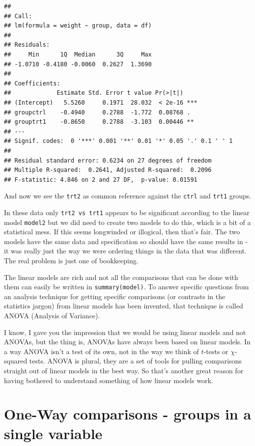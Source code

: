 \documentclass[
]{book}
\newenvironment{sidenote}
{ \begin{tcolorbox}[colbacktitle=blue!50!white,
title=huh?,coltitle=white,
fonttitle=\bfseries] }
{  \end{tcolorbox} }
\begin{document}
\begin{verbatim}
## 
## Call:
## lm(formula = weight ~ group, data = df)
## 
## Residuals:
##     Min      1Q  Median      3Q     Max 
## -1.0710 -0.4180 -0.0060  0.2627  1.3690 
## 
## Coefficients:
##             Estimate Std. Error t value Pr(>|t|)    
## (Intercept)   5.5260     0.1971  28.032  < 2e-16 ***
## groupctrl    -0.4940     0.2788  -1.772  0.08768 .  
## grouptrt1    -0.8650     0.2788  -3.103  0.00446 ** 
## ---
## Signif. codes:  0 '***' 0.001 '**' 0.01 '*' 0.05 '.' 0.1 ' ' 1
## 
## Residual standard error: 0.6234 on 27 degrees of freedom
## Multiple R-squared:  0.2641,	Adjusted R-squared:  0.2096 
## F-statistic: 4.846 on 2 and 27 DF,  p-value: 0.01591
\end{verbatim}

And now we see the \texttt{trt2} as common reference against the \texttt{ctrl} and \texttt{trt1} groups.

In these data only \texttt{trt2\ vs\ trt1} appears to be significant according to the linear model \texttt{model2} but we did need to create two models to do this, which is a bit of a statistical mess. If this seems longwinded or illogical, then that's fair. The two models have the same data and specification so should have the same results in - it was really just the way we were ordering things in the data that was different. The real problem is just one of bookkeeping.

The linear models are rich and not all the comparisons that can be done with them can easily be written in \texttt{summary(model)}. To answer specific questions from an analysis technique for getting specific comparisons (or contrasts in the statistics jargon) from linear models has been invented, that technique is called ANOVA (Analysis of Variance).

\begin{sidenote}
I know, I gave you the impression that we would be using linear models and not ANOVAs, but the thing is, ANOVAs have always been based on linear models. In a way ANOVA isn't a test of its own, not in the way we think of \(t\)-tests or \(\chi\)-squared tests. ANOVA is plural, they are a set of tools for pulling comparisons straight out of linear models in the best way. So that's another great reason for having bothered to understand something of how linear models work.
\end{sidenote}

\hypertarget{one-way-comparisons---groups-in-a-single-variable}{%
\section{One-Way comparisons - groups in a single variable}\label{one-way-comparisons---groups-in-a-single-variable}}
\end{document}
